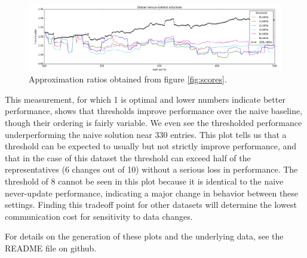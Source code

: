 \begin{figure}
    \centering
    \includegraphics[width=\linewidth]{ratio}
    \caption{Approximation ratios obtained from figure \ref{fig:scores}.}
    \label{fig:ratio}
\end{figure}

This measurement, for which 1 is optimal and lower numbers indicate better performance, shows that thresholds improve performance over the naive baseline, though their ordering is fairly variable. We even see the thresholded performance underperforming the naive solution near 330 entries. This plot tells us that a threshold can be expected to usually but not strictly improve performance, and that in the case of this dataset the threshold can exceed half of the representatives (6 changes out of 10) without a serious loss in performance. The threshold of 8 cannot be seen in this plot because it is identical to the naive never-update performance, indicating a major change in behavior between these settings. Finding this tradeoff point for other datasets will determine the lowest communication cost for sensitivity to data changes.

For details on the generation of these plots and the underlying data, see the README file on github.